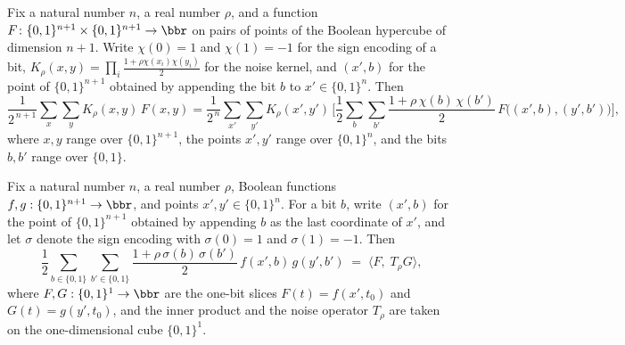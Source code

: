 \begin{lemma}
\label{BooleanAnalysis.Hypercontractivity.weighted_sum_succ_decomp}
\leanok
{}
Fix a natural number $n$, a real number $\rho$, and a function $F \colon \{0,1\}^{n+1} \times \{0,1\}^{n+1} \to
\bbr$ on pairs of points of the Boolean hypercube of dimension $n+1$. Write $\chi(0)=1$ and $\chi(1)=-1$ for
the sign encoding of a bit, $K_\rho(x,y)=\prod_i\frac{1+\rho\chi(x_i)\chi(y_i)}{2}$ for the noise kernel, and
$(x',b)$ for the point of $\{0,1\}^{n+1}$ obtained by appending the bit $b$
to $x' \in \{0,1\}^n$. Then
\[
  \frac{1}{2^{\,n+1}}\sum_{x}\sum_{y} K_\rho(x,y)\, F(x,y)
  =
  \frac{1}{2^{\,n}}\sum_{x'}\sum_{y'} K_\rho(x',y')\,
  \Biggl[\frac12 \sum_{b}\sum_{b'} \frac{1+\rho\,\chi(b)\,\chi(b')}{2}\,
  F\bigl((x',b),(y',b')\bigr)\Biggr],
\]
where $x,y$ range over $\{0,1\}^{n+1}$, the points $x',y'$ range over $\{0,1\}^{n}$, and
the bits $b,b'$ range over $\{0,1\}$.
\end{lemma}

\begin{lemma}
\label{BooleanAnalysis.Hypercontractivity.one_bit_slice_eq_innerProduct}
\leanok
{}
Fix a natural number $n$, a real number $\rho$, Boolean functions $f, g : \{0,1\}^{n+1} \to \bbr$, and points
$x', y' \in \{0,1\}^n$. For a bit $b$, write $(x', b)$ for the point of $\{0,1\}^{n+1}$
obtained by appending $b$ as the last coordinate of $x'$, and let $\sigma$ denote the
sign encoding with $\sigma(0)=1$ and $\sigma(1)=-1$. Then
\[
  \frac12 \sum_{b \in \{0,1\}} \sum_{b' \in \{0,1\}}
    \frac{1 + \rho\,\sigma(b)\,\sigma(b')}{2}\,
    f(x', b)\, g(y', b')
  \;=\;
  \langle F,\; T_\rho G\rangle,
\]
where $F, G : \{0,1\}^1 \to \bbr$ are the one-bit slices $F(t) = f(x', t_0)$ and $G(t) =
g(y', t_0)$, and the inner product and the noise operator $T_\rho$ are taken on the
one-dimensional cube $\{0,1\}^1$.
\end{lemma}

